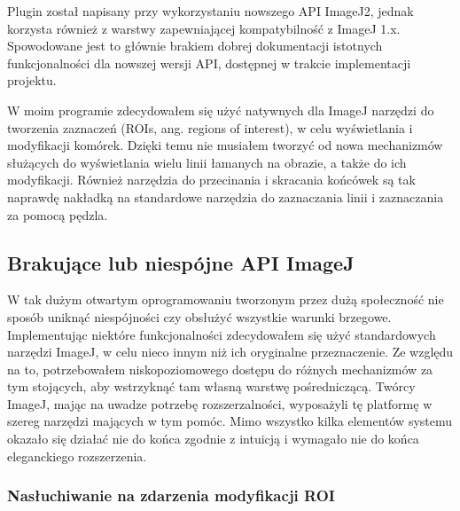 \documentclass[declaration,shortabstract,mgr]{iithesis}
\begin{document}
Plugin został napisany przy wykorzystaniu nowszego API ImageJ2, jednak korzysta również z warstwy zapewniającej kompatybilność z ImageJ 1.x.
Spowodowane jest to głównie brakiem dobrej dokumentacji istotnych funkcjonalności dla nowszej wersji API, dostępnej w trakcie implementacji projektu.

W moim programie zdecydowałem się użyć natywnych dla ImageJ narzędzi do tworzenia zaznaczeń (ROIs, ang. regions of interest), w celu wyświetlania i modyfikacji komórek.
Dzięki temu nie musiałem tworzyć od nowa mechanizmów służących do wyświetlania wielu linii łamanych na obrazie, a także do ich modyfikacji.
Również narzędzia do przecinania i skracania końcówek są tak naprawdę nakładką na standardowe narzędzia do zaznaczania linii i zaznaczania za pomocą pędzla.

\subsection{Brakujące lub niespójne API ImageJ}

W tak dużym otwartym oprogramowaniu tworzonym przez dużą społeczność nie sposób uniknąć niespójności czy obsłużyć wszystkie warunki brzegowe.
Implementując niektóre funkcjonalności zdecydowałem się użyć standardowych narzędzi ImageJ, w celu nieco innym niż ich oryginalne przeznaczenie.
Ze względu na to, potrzebowałem niskopoziomowego dostępu do różnych mechanizmów za tym stojących, aby wstrzyknąć tam własną warstwę pośredniczącą.
Twórcy ImageJ, mając na uwadze potrzebę rozszerzalności, wyposażyli tę platformę w szereg narzędzi mających w tym pomóc.
Mimo wszystko kilka elementów systemu okazało się działać nie do końca zgodnie z intuicją i wymagało nie do końca eleganckiego rozszerzenia.

\subsubsection{Nasłuchiwanie na zdarzenia modyfikacji ROI}
\end{document}
